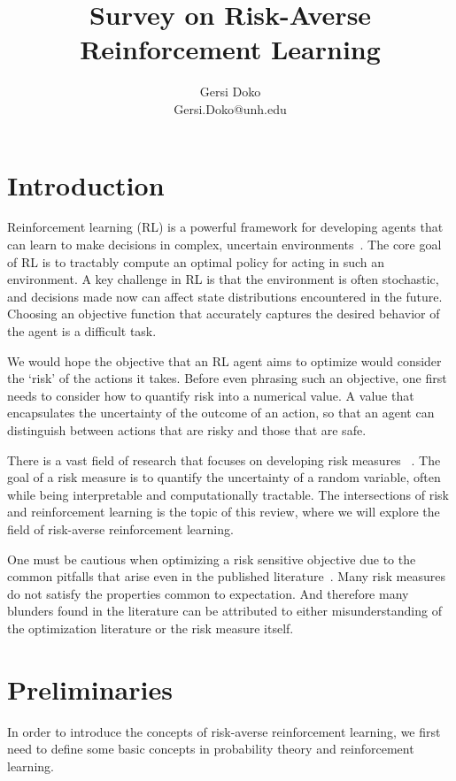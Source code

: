 \documentclass[10pt]{article}
\title{Survey on Risk-Averse Reinforcement Learning}
\author{Gersi Doko \\
        Gersi.Doko@unh.edu \\}
\renewcommand{\cite}{\citep}
\theoremstyle{plain}
\theoremstyle{remark}
\begin{document}
\maketitle

\section{Introduction}

Reinforcement learning (RL) is a powerful framework for developing agents that can learn to make decisions in complex, uncertain environments~\cite{MEHTA2007237, Hall2018}.
The core goal of RL is to tractably compute an optimal policy for acting in such an environment. A key challenge in RL is 
that the environment is often stochastic, and decisions made now can affect state distributions encountered in the
future. Choosing an objective function that accurately captures the desired behavior of the agent is a difficult task.

We would hope the objective that an RL agent aims to optimize would consider the `risk' of the actions it takes. Before even phrasing such an objective, one first needs to consider how to quantify risk into a numerical value. A value that encapsulates the uncertainty of the outcome of an action,
so that an agent can distinguish between actions that are risky and those that are safe.

There is a vast field of research that focuses on developing risk measures ~\cite{howard1972}. The goal of a risk measure is to quantify the uncertainty of a random variable, often while being interpretable and computationally tractable. The intersections of risk and reinforcement learning is the topic of this review, where we will explore the field of risk-averse reinforcement learning.

One must be cautious when optimizing a risk sensitive objective due to the
common pitfalls that arise even in the published
literature~\cite{Hau2023OnDP}. Many risk measures do not satisfy the
properties common to expectation. And therefore many blunders found in the literature can be attributed to either
misunderstanding of the optimization literature or the risk measure itself.

\section{Preliminaries}

In order to introduce the concepts of risk-averse reinforcement learning, we first need to define some basic concepts in probability theory and reinforcement learning.
\end{document}
